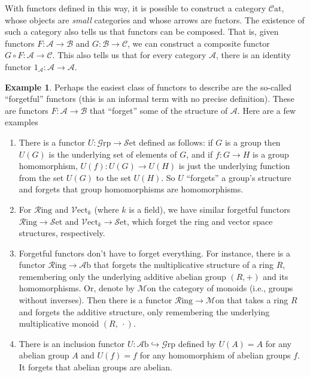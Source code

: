 \documentclass[10pt,oneside]{book}
\def\~#1{\mathscr{#1}}
\newcommand{\Set}{\~S\mathrm{et}}
\newcommand{\Grp}{\~G\mathrm{rp}}
\newcommand{\Ab}{\~A\mathrm{b}}
\newcommand{\Ring}{\~R\mathrm{ing}}
\newcommand{\Vect}{\~V\mathrm{ect}}
\newcommand{\Cat}{\~C\mathrm{at}}
\newcommand{\Mon}{\~M\mathrm{on}}
\theoremstyle{plain}
\theoremstyle{definition}
\newtheorem{ex}[thm]{Example}
\theoremstyle{remark}
\numberwithin{equation}{section}
\numberwithin{figure}{section}
\begin{document}
With functors defined in this way, it is possible to construct a category $\Cat$, whose objects are \emph{small} categories and whose arrows are fuctors. The existence of such a category also tells us that functors can be composed. That is, given functors $F: \~A \to \~B$ and $G: \~B \to \~C$, we can construct a composite functor $G \circ F: \~A \to \~C$. This also tells us that for every category $\~A$, there is an identity functor $1_\~A : \~A \to \~A$.

\begin{ex}
\label{ex:forgetful_functors}
    Perhaps the easiest class of functors to describe are the so-called ``forgetful'' functors (this is an informal term with no precise definition). These are functors $F: \~A \to \~B$ that ``forget'' some of the structure of $\~A$. Here are a few examples
    \begin{enumerate}[label=(\roman*)]
        \item There is a functor $U: \Grp \to \Set$ defined as follows: if $G$ is a group then $U(G)$ is the underlying set of elements of $G$, and if $f: G \to H$ is a group homomorphism, $U(f): U(G) \to U(H)$ is just the underlying function from the set $U(G)$ to the set $U(H)$. So $U$ ``forgets'' a group's structure and forgets that group homomorphisms are homomorphisms.
        \item For $\Ring$ and $\Vect_k$ (where $k$ is a field), we have similar forgetful functors $\Ring \to \Set$ and $\Vect_k \to \Set$, which forget the ring and vector space structures, respectively.
        \item Forgetful functors don't have to forget everything. For instance, there is a functor $\Ring \to \Ab$ that forgets the multiplicative structure of a ring $R$, remembering only the underlying additive abelian group $(R, +)$ and its homomorphisms. Or, denote by $\Mon$ the category of monoids (i.e., groups without inverses). Then there is a functor $\Ring \to \Mon$ that takes a ring $R$ and forgets the additive structure, only remembering the underlying multiplicative monoid $(R, ~\cdot)$.
        \item There is an inclusion functor $U: \Ab \hookrightarrow \Grp$ defined by $U(A) = A$ for any abelian group $A$ and $U(f) = f$ for any homomorphism of abelian groups $f$. It forgets that abelian groups are abelian.
    \end{enumerate}
\end{ex}
\end{document}
